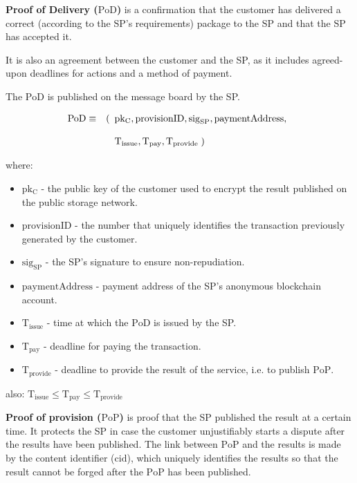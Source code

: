 \documentclass[pdftex,twocolumn,epjc3]{svjour3}
\begin{document}
{\noindent \textbf
{Proof of Delivery ($\mathrm{PoD}$)}\label{proof-of-delivery} is a confirmation that the customer has delivered a correct (according to the SP's requirements) package to the SP and that the SP has accepted it.

It is also an agreement between the customer and the SP, as it includes agreed-upon deadlines for actions and a method of payment.

The $\mathrm{PoD}$ is published on the message board by the SP. 

\begin{eqnarray}
\mathrm{PoD} & \equiv & (\begin{array}[t]{l}\mathrm{pk_C}, \mathrm{provisionID},  \mathrm{sig}_\mathrm{SP}, \mathrm{paymentAddress}, \\\\ 
\mathrm{T}_\mathrm{issue}, \mathrm{T}_\mathrm{pay}, \mathrm{T}_\mathrm{provide}\; )\end{array}
\end{eqnarray}

where:

\begin{itemize}
\item $\mathrm{pk_C}$ - the public key of the customer used to encrypt the result published on the public storage network.
\item $\mathrm{provisionID}$ - the number that uniquely identifies the transaction previously generated by the customer.
\item $\mathrm{sig}_\mathrm{SP}$ - the SP's signature to ensure non-repudiation.
\item $\mathrm{paymentAddress}$ - payment address of the SP's anonymous blockchain account.
\item $\mathrm{T}_\mathrm{issue}$ - time at which the $\mathrm{PoD}$ is issued by the SP.
\item
  $\mathrm{T}_\mathrm{pay}$ - deadline for paying the transaction.
\item
  $\mathrm{T}_\mathrm{provide}$ - deadline to provide the result of the service, i.e. to publish $\mathrm{PoP}$.
\end{itemize}

also:
\(\mathrm{T}_\mathrm{issue} \leq \mathrm{T}_\mathrm{pay} \leq \mathrm{T}_\mathrm{provide}\)


\noindent \textbf
{Proof of provision ($\mathrm{PoP}$)}\label{proof-of-provision} is proof that the SP published the result at a certain time. It protects the SP in case the customer unjustifiably starts a dispute after the results have been published. The link between $\mathrm{PoP}$ and the results is made by the content identifier ($\mathrm{cid}$), which uniquely identifies the results so that the result cannot be forged after the $\mathrm{PoP}$ has been published.

}
\end{document}
